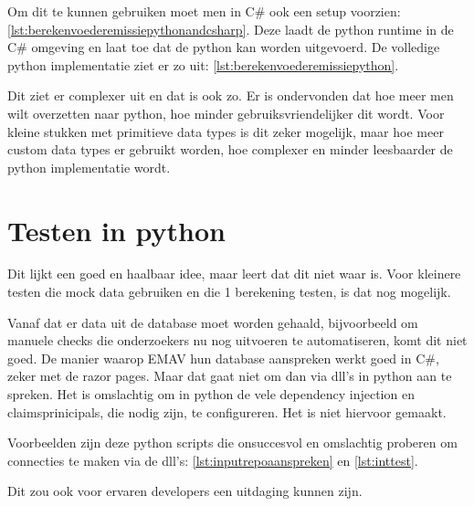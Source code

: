 Om dit te kunnen gebruiken moet men in C\# ook een setup voorzien: \ref{lst:berekenvoederemissiepythonandcsharp}.
Deze laadt de python runtime in de C\# omgeving en laat toe dat de python kan worden uitgevoerd.
De volledige python implementatie ziet er zo uit: \ref{lst:berekenvoederemissiepython}.

Dit ziet er complexer uit en dat is ook zo.
Er is ondervonden dat hoe meer men wilt overzetten naar python, hoe minder gebruiksvriendelijker dit wordt.
Voor kleine stukken met primitieve data types is dit zeker mogelijk, maar hoe meer custom data types er gebruikt worden,
hoe complexer en minder leesbaarder de python implementatie wordt.

\section{Testen in python}
Dit lijkt een goed en haalbaar idee, maar leert dat dit niet waar is.
Voor kleinere testen die mock data gebruiken en die 1 berekening testen, is dat nog mogelijk.

Vanaf dat er data uit de database moet worden gehaald, bijvoorbeeld om manuele checks die onderzoekers nu nog uitvoeren te automatiseren, komt dit niet goed.
De manier waarop EMAV hun database aanspreken werkt goed in C\#, zeker met de razor pages.
Maar dat gaat niet om dan via dll's in python aan te spreken.
Het is omslachtig om in python de vele dependency injection en claimsprinicipals, die nodig zijn, te configureren.
Het is niet hiervoor gemaakt.

Voorbeelden zijn deze python scripts die onsuccesvol en omslachtig proberen om connecties te maken via de dll's:
\ref{lst:inputrepoaanspreken} en \ref{lst:inttest}.

Dit zou ook voor ervaren developers een uitdaging kunnen zijn.
